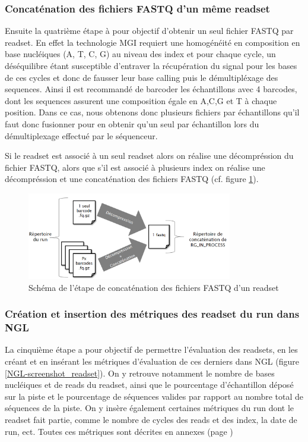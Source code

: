 \subsubsection*{Concaténation des fichiers FASTQ d'un même readset}
Ensuite la quatrième étape à pour objectif d'obtenir un seul fichier FASTQ par readset.
En effet la technologie MGI requiert une homogénéité en composition en base nucléiques (A, T, C, G) au niveau des index et pour chaque cycle, un déséquilibre étant susceptible d'entraver la récupération du signal pour les bases de ces cycles et donc de fausser leur base calling puis le démultipléxage des sequences.
Ainsi il est recommandé de \og barcoder \fg{} les échantillons avec 4 barcodes, dont les sequences assurent une composition égale en A,C,G et T à chaque position.
Dans ce cas, nous obtenons donc plusieurs fichiers par échantillons qu'il faut donc fusionner pour en obtenir qu'un seul par échantillon lors du démultiplexage effectué par le séquenceur.

Si le readset est associé à un seul readset alors on réalise une décompréssion du fichier FASTQ, alors que s'il est associé à plusieurs index on réalise une décompréssion et une concaténation des fichiers FASTQ (cf. figure \ref{schema-concat-fastq}).

\begin{figure}[H]
    \centering
    \includegraphics[width=0.8\textwidth]{img/Schéma_concaténation.png}
    \caption{\footnotesize{Schéma de l'étape de \og concaténation\fg{} des fichiers FASTQ d'un readset}}
    \label{schema-concat-fastq}
\end{figure}

\subsubsection*{Création et insertion des métriques des readset du run dans NGL}
La cinquième étape a pour objectif de permettre l'évaluation des readsets, en les créant et en insérant les métriques d'évaluation de ces derniers dans NGL (figure \ref{NGL-screenshot_readset}).
On y retrouve notamment le nombre de bases nucléiques et de reads du readset, ainsi que le pourcentage d'échantillon déposé sur la piste et le pourcentage de séquences valides par rapport au nombre total de séquences de la piste.
On y insère également certaines métriques du run dont le readset fait partie, comme le nombre de cycles des reads et des index, la date de run, ect. Toutes ces métriques sont décrites en annexes (page \pageref{anexes3})\\

